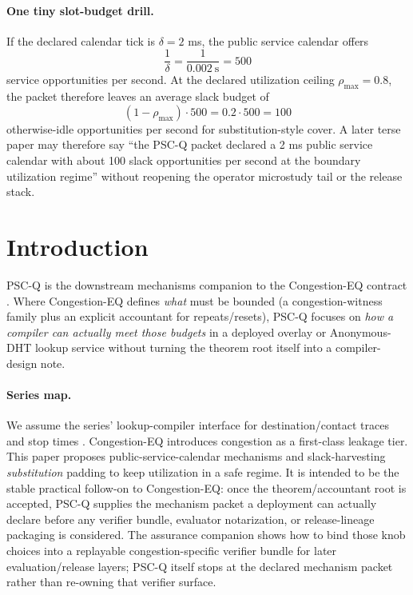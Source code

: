 \documentclass[11pt]{article}
\theoremstyle{definition}
\theoremstyle{remark}
\begin{document}
\paragraph{One tiny slot-budget drill.}
If the declared calendar tick is $\delta=2$ ms, the public service calendar offers
\[
\frac{1}{\delta} = \frac{1}{0.002\ \mathrm{s}} = 500
\]
service opportunities per second.
At the declared utilization ceiling $\rho_{\max}=0.8$, the packet therefore leaves an average slack budget of
\[
(1-\rho_{\max})\cdot 500 = 0.2\cdot 500 = 100
\]
otherwise-idle opportunities per second for substitution-style cover.
A later terse paper may therefore say ``the PSC-Q packet declared a 2 ms public service calendar with about 100 slack opportunities per second at the boundary utilization regime'' without reopening the operator microstudy tail or the release stack.


\section{Introduction}
PSC-Q is the downstream mechanisms companion to the Congestion-EQ contract \cite{series:congeq}.
Where Congestion-EQ defines \emph{what} must be bounded (a congestion-witness family plus an explicit accountant for repeats/resets), PSC-Q focuses on \emph{how a compiler can actually meet those budgets} in a deployed overlay or Anonymous-DHT lookup service without turning the theorem root itself into a compiler-design note.

\paragraph{Series map.}
We assume the series' lookup-compiler interface for destination/contact traces and stop times \cite{series:schedcompiler,series:knapsacktransport}.
Congestion-EQ \cite{series:congeq} introduces congestion as a first-class leakage tier.
This paper proposes public-service-calendar mechanisms and slack-harvesting \emph{substitution} padding to keep utilization in a safe regime.
It is intended to be the stable practical follow-on to Congestion-EQ: once the theorem/accountant root is accepted, PSC-Q supplies the mechanism packet a deployment can actually declare before any verifier bundle, evaluator notarization, or release-lineage packaging is considered. The assurance companion \cite{series:wcongeq} shows how to bind those knob choices into a replayable congestion-specific verifier bundle for later evaluation/release layers; PSC-Q itself stops at the declared mechanism packet rather than re-owning that verifier surface.
\end{document}
